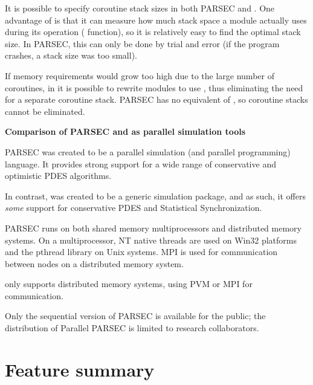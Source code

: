 It is possible to specify coroutine stack sizes in both PARSEC 
and {\opp}. One advantage of {\opp} is that it can measure 
how much stack space a module actually uses during its operation 
( function), so it is relatively easy to find the 
optimal stack size. In PARSEC, this can only be done by trial 
and error (if the program crashes, a stack size was too small). 

If memory requirements would grow too high due to the large number 
of coroutines, in {\opp} it is possible to rewrite modules to 
use , thus eliminating the need for a separate 
coroutine stack. PARSEC has no equivalent of , 
so coroutine stacks cannot be eliminated.


\textbf{Comparison of PARSEC and {\opp} as parallel simulation tools}


PARSEC was created to be a parallel simulation (and parallel 
programming) language. It provides strong support for a wide 
range of conservative and optimistic PDES algorithms.


In contrast, {\opp} was created to be a generic simulation package, 
and as such, it offers \textit{some} support for conservative PDES 
and Statistical Synchronization.


PARSEC runs on both shared memory multiprocessors and distributed 
memory systems. On a multiprocessor, NT native threads are used 
on Win32 platforms and the pthread library on Unix systems. MPI 
is used for communication between nodes on a distributed memory 
system.


{\opp} only supports distributed memory systems, using PVM or 
MPI for communication.

Only the sequential version of PARSEC is available for the public; 
the distribution of Parallel PARSEC is limited to research collaborators.





\section{Feature summary}


